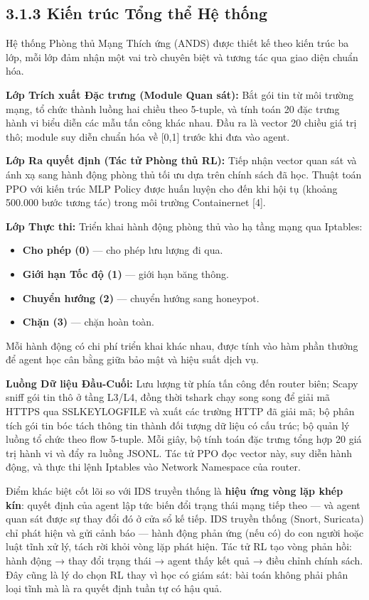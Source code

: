 \documentclass[12pt,a4paper,twoside]{report}
\begin{document}
{\subsection{3.1.3 Kiến trúc Tổng thể Hệ thống}

Hệ thống Phòng thủ Mạng Thích ứng (ANDS) được thiết kế theo kiến trúc ba lớp, mỗi lớp đảm nhận một vai trò chuyên biệt và tương tác qua giao diện chuẩn hóa.

\textbf{Lớp Trích xuất Đặc trưng (Module Quan sát):} Bắt gói tin từ môi trường mạng, tổ chức thành luồng hai chiều theo 5-tuple, và tính toán 20 đặc trưng hành vi biểu diễn các mẫu tấn công khác nhau. Đầu ra là vector 20 chiều giá trị thô; module suy diễn chuẩn hóa về [0,1] trước khi đưa vào agent.

\textbf{Lớp Ra quyết định (Tác tử Phòng thủ RL):} Tiếp nhận vector quan sát và ánh xạ sang hành động phòng thủ tối ưu dựa trên chính sách đã học. Thuật toán PPO với kiến trúc MLP Policy được huấn luyện cho đến khi hội tụ (khoảng 500.000 bước tương tác) trong môi trường Containernet [4].

\textbf{Lớp Thực thi:} Triển khai hành động phòng thủ vào hạ tầng mạng qua Iptables:
\begin{itemize}
\item \textbf{Cho phép (0)} — cho phép lưu lượng đi qua.
\item \textbf{Giới hạn Tốc độ (1)} — giới hạn băng thông.
\item \textbf{Chuyển hướng (2)} — chuyển hướng sang honeypot.
\item \textbf{Chặn (3)} — chặn hoàn toàn.
\end{itemize}

Mỗi hành động có chi phí triển khai khác nhau, được tính vào hàm phần thưởng để agent học cân bằng giữa bảo mật và hiệu suất dịch vụ.

\textbf{Luồng Dữ liệu Đầu-Cuối:} Lưu lượng từ phía tấn công đến router biên; Scapy sniff gói tin thô ở tầng L3/L4, đồng thời tshark chạy song song để giải mã HTTPS qua SSLKEYLOGFILE và xuất các trường HTTP đã giải mã; bộ phân tích gói tin bóc tách thông tin thành đối tượng dữ liệu có cấu trúc; bộ quản lý luồng tổ chức theo flow 5-tuple. Mỗi giây, bộ tính toán đặc trưng tổng hợp 20 giá trị hành vi và đẩy ra luồng JSONL. Tác tử PPO đọc vector này, suy diễn hành động, và thực thi lệnh Iptables vào Network Namespace của router.

Điểm khác biệt cốt lõi so với IDS truyền thống là \textbf{hiệu ứng vòng lặp khép kín}: quyết định của agent lập tức biến đổi trạng thái mạng tiếp theo — và agent quan sát được sự thay đổi đó ở cửa sổ kế tiếp. IDS truyền thống (Snort, Suricata) chỉ phát hiện và gửi cảnh báo — hành động phản ứng (nếu có) do con người hoặc luật tĩnh xử lý, tách rời khỏi vòng lặp phát hiện. Tác tử RL tạo vòng phản hồi: hành động → thay đổi trạng thái → agent thấy kết quả → điều chỉnh chính sách. Đây cũng là lý do chọn RL thay vì học có giám sát: bài toán không phải phân loại tĩnh mà là ra quyết định tuần tự có hậu quả.

}
\end{document}
